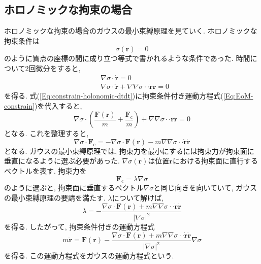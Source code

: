 \subsection{ホロノミックな拘束の場合}
ホロノミックな拘束の場合のガウスの最小束縛原理を見ていく.
ホロノミックな拘束条件は
\begin{equation}
    \sigma (\bm{r}) = 0
\end{equation}
のように質点の座標の間に成り立つ等式で書かれるような条件であった.
時間について2回微分をすると,
\begin{align}
    &
    \nabla \sigma \cdot \dot{\bm{r}} = 0
    \\
    &
    \nabla \sigma \cdot \ddot{\bm{r}} +
    \nabla \nabla \sigma \cdot\cdot \dot{\bm{r}} \dot{\bm{r}} = 0
    \label{Eq:constrain-holonomic-dtdt}
\end{align}
を得る. 式(\ref{Eq:constrain-holonomic-dtdt})に拘束条件付き運動方程式(\ref{Eq:EoM-constrain})を代入すると,
\begin{equation}
    \nabla \sigma \cdot
    \left(
        \frac{\bm{F}(\bm{r})}{m}
        +
        \frac{\bm{F}_{\mathrm{c}}}{m}
    \right)
    +
    \nabla \nabla \sigma \cdot\cdot \dot{\bm{r}} \dot{\bm{r}}
    =
    0
\end{equation}
となる. これを整理すると,
\begin{equation}
    \nabla\sigma \cdot \bm{F}_{\mathrm{c}}
    =
    -
    \nabla\sigma \cdot \bm{F}(\bm{r})
    - m
    \nabla \nabla \sigma \cdot\cdot \dot{\bm{r}} \dot{\bm{r}}
\end{equation}
となる.
ガウスの最小束縛原理では, 拘束力を最小にするには拘束力が拘束面に垂直になるように選ぶ必要があった.
$\nabla \sigma(\bm{r})$は位置$\bm{r}$における拘束面に直行するベクトルを表す.
拘束力を
\begin{equation}
\bm{F}_{\mathrm{c}} = \lambda \nabla \sigma
\end{equation}
のように選ぶと, 拘束面に垂直するベクトル$\nabla \sigma$と同じ向きを向いていて, ガウスの最小束縛原理の要請を満たす.
$\lambda$について解けば,
\begin{equation}
    \lambda=
    -
    \frac{\nabla\sigma \cdot \bm{F}(\bm{r}) + m
    \nabla \nabla \sigma \cdot\cdot \dot{\bm{r}} \dot{\bm{r}}}{|\nabla \sigma|^{2}}
\end{equation}
を得る. したがって, 拘束条件付きの運動方程式
\begin{equation}
    m \ddot{\bm{r}}
    =
    \bm{F}(\bm{r})
    -
    \frac{\nabla\sigma \cdot \bm{F}(\bm{r}) + m
    \nabla \nabla \sigma \cdot\cdot \dot{\bm{r}} \dot{\bm{r}}}{|\nabla \sigma|^{2}}
    \nabla \sigma
\end{equation}
を得る. この運動方程式をガウスの運動方程式という.

